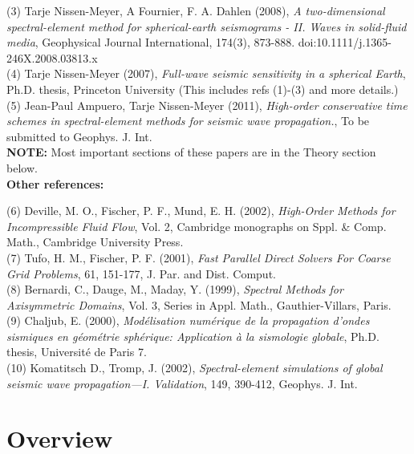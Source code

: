 \documentclass[11pt,letter,fleqn,english,notitlepage]{article}
\begin{document}
(3) Tarje Nissen-Meyer, A Fournier, F. A. Dahlen (2008),  
\textit{A two-dimensional spectral-element method for   
spherical-earth seismograms - II. Waves in solid-fluid media},
Geophysical Journal International, 174(3), 873-888.
doi:10.1111/j.1365-246X.2008.03813.x\\

(4) Tarje Nissen-Meyer (2007),
\textit{Full-wave seismic sensitivity in a spherical Earth},
Ph.D. thesis, Princeton University
(This includes refs (1)-(3) and more details.)\\

(5) Jean-Paul Ampuero, Tarje Nissen-Meyer (2011),
\textit{High-order conservative time schemes in spectral-element methods 
for seismic wave propagation.}, To be submitted to Geophys. J. Int.\\

\noindent \textbf{NOTE:} Most important sections of these papers are in the Theory section below.\\

\noindent \textbf{Other references:}\vspace*{0.2cm}

(6) Deville, M. O., Fischer, P. F., Mund, E. H. (2002), 
\textit{High-Order Methods for Incompressible Fluid Flow}, 
Vol. 2, Cambridge monographs on Sppl. \& Comp. Math., Cambridge University Press.\\

(7) Tufo, H. M., Fischer, P. F. (2001), \textit{Fast Parallel Direct Solvers For Coarse Grid Problems}, 
61, 151-177, J. Par. and Dist. Comput.\\

(8) Bernardi, C., Dauge, M., Maday, Y. (1999), \textit{Spectral Methods for Axisymmetric Domains}, 
Vol. 3, Series in Appl. Math., Gauthier-Villars, Paris.\\

(9) Chaljub, E. (2000), \textit{Mod{\'{e}}lisation num{\'{e}}rique de la 
propagation d'ondes sismiques en g{\'{e}}om{\'{e}}trie sph{\'{e}}rique: Application {\`{a}} la sismologie globale}, 
Ph.D. thesis, Universit{\'{e}} de Paris 7.\\

(10) Komatitsch D., Tromp, J. (2002), \textit{Spectral-element simulations of global seismic wave propagation---{I. V}alidation},
149, 390-412, Geophys. J. Int.

\section{Overview}
\end{document}
